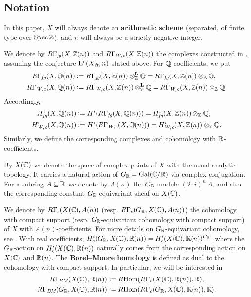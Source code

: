 \documentclass{article}
\numberwithin{equation}{section}
\begin{document}
\subsection*{Notation}

In this paper, $X$ will always denote an \textbf{arithmetic scheme} (separated,
of finite type over $\Spec \ZZ$), and $n$ will always be a strictly negative
integer.

We denote by $R\Gamma_\fg (X, \ZZ (n))$ and $R\Gamma_\Wc (X, \ZZ (n))$ the
complexes constructed in \cite{Beshenov-Weil-etale-1}, assuming the conjecture
$\mathbf{L}^c (X_\et,n)$ stated above. For $\QQ$-coefficients, we put
\begin{align*}
  R\Gamma_\fg (X, \QQ (n)) & \dfn
  R\Gamma_\fg (X, \ZZ (n)) \otimes_\ZZ^\mathbf{L} \QQ =
  R\Gamma_\fg (X, \ZZ (n)) \otimes_\ZZ \QQ, \\
  R\Gamma_\Wc (X, \QQ (n)) & \dfn
  R\Gamma_\Wc (X, \ZZ (n)) \otimes_\ZZ^\mathbf{L} \QQ =
  R\Gamma_\Wc (X, \ZZ (n)) \otimes_\ZZ \QQ.
\end{align*}
Accordingly,
\begin{align*}
  H^i_\fg (X, \QQ (n)) & \dfn
  H^i (R\Gamma_\fg (X, \QQ (n))) = H^i_\fg (X, \ZZ (n)) \otimes_\ZZ \QQ, \\
  H^i_\Wc (X, \QQ (n)) & \dfn
  H^i (R\Gamma_\Wc (X, \QQ (n))) = H^i_\Wc (X, \ZZ (n)) \otimes_\ZZ \QQ.
\end{align*}
Similarly, we define the corresponding complexes and cohomology with
$\RR$-coefficients.

By $X (\CC)$ we denote the space of complex points of $X$ with the usual
analytic topology. It carries a natural action of $G_\RR = \Gal (\CC/\RR)$ via
complex conjugation. For a subring $A \subseteq \RR$ we denote by $A (n)$ the
$G_\RR$-module $(2\pi i)^n\,A$, and also the corresponding constant
$G_\RR$-equivariant sheaf on $X (\CC)$.

We denote by $R\Gamma_c (X (\CC), A (n))$
(resp. $R\Gamma_c (G_\RR, X (\CC), A (n))$) the cohomology with compact
support (resp. $G_\RR$-equivariant cohomology with compact support) of $X$ with
$A (n)$-coefficients. For more details on $G_\RR$-equivariant cohomology,
see \cite{Beshenov-Weil-etale-1}. With real coefficients,
$H_c^i (G_\RR, X (\CC), \RR (n)) = H^i_c (X (\CC), \RR (n))^{G_\RR}$,
where the $G_\RR$-action on $H^i_c (X (\CC), \RR (n))$ naturally comes from the
corresponding action on $X (\CC)$ and $\RR (n)$.
The \textbf{Borel--Moore homology} is defined as dual to the cohomology with
compact support. In particular, we will be interested in
\begin{align*}
  R\Gamma_\BM (X (\CC), \RR (n)) & \dfn
  \RHom (R\Gamma_c (X (\CC), \RR (n)), \RR), \\
  R\Gamma_\BM (G_\RR, X (\CC), \RR (n)) & \dfn
  \RHom (R\Gamma_c (G_\RR, X (\CC), \RR (n)), \RR).
\end{align*}
\end{document}
